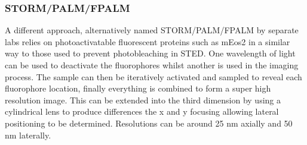 \documentclass[a4paper, 11pt]{article}
\numberwithin{equation}{section}
\begin{document}
\subsubsection{STORM/PALM/FPALM}
A different approach, alternatively named STORM/PALM/FPALM by separate labs relies on photoactivatable fluorescent proteins such as mEos2 \cite{dani2010new} in a similar way to those used to prevent photobleaching in STED. One wavelength of light can be used to deactivate the fluorophores whilst another is used in the imaging process. The sample can then be iteratively activated and sampled to reveal each fluorophore location, finally everything is combined to form a super high resolution image. This can be extended into the third dimension by using a cylindrical lens to produce differences the x and y focusing allowing lateral positioning to be determined. Resolutions can be around 25 nm axially and 50 nm laterally\cite{huang2009super}.\\
\end{document}
